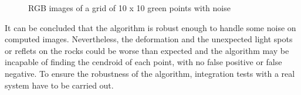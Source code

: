 \begin{figure}[!h] 
\centering
{}
\quad 
{}
\caption{RGB images of a grid of 10 x 10 green points with noise} 
\end{figure}

It can be concluded that the algorithm is robust enough to handle some noise on computed images. Nevertheless, the deformation and the unexpected light spots or reflets on the rocks could be worse than expected and the algorithm may be incapable of finding the cendroid of each point, with no false positive or false negative. To ensure the robustness of the algorithm, integration tests with a real system have to be carried out.